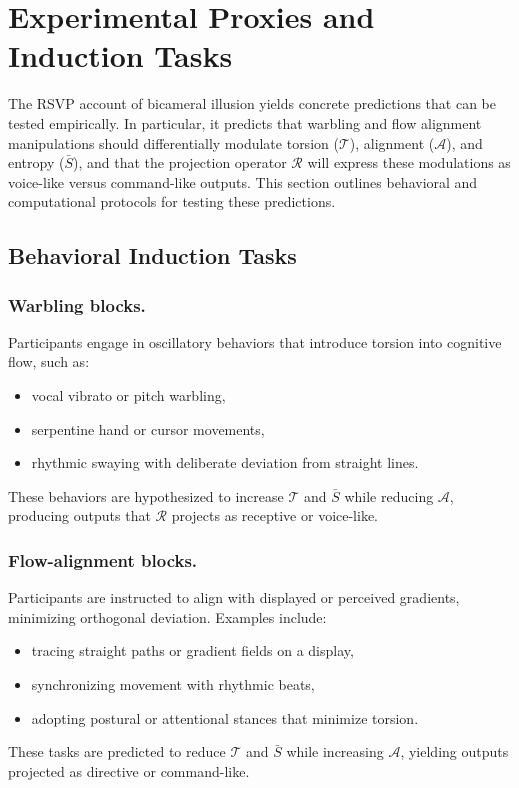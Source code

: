 \documentclass[a4paper,11pt]{article}
\begin{document}
\section{Experimental Proxies and Induction Tasks}
\label{sec:experimental}

The RSVP account of bicameral illusion yields concrete predictions that can be
tested empirically. In particular, it predicts that warbling and
flow alignment manipulations should differentially modulate torsion
($\mathcal{T}$), alignment ($\mathcal{A}$), and entropy ($\bar{S}$), and that
the projection operator $\mathcal{R}$ will express these modulations as
voice-like versus command-like outputs. This section outlines behavioral and
computational protocols for testing these predictions.

\subsection{Behavioral Induction Tasks}

\subsubsection{Warbling blocks.}
Participants engage in oscillatory behaviors that introduce torsion into
cognitive flow, such as:
\begin{itemize}
    \item vocal vibrato or pitch warbling,
    \item serpentine hand or cursor movements,
    \item rhythmic swaying with deliberate deviation from straight lines.
\end{itemize}
These behaviors are hypothesized to increase $\mathcal{T}$ and $\bar{S}$ while
reducing $\mathcal{A}$, producing outputs that $\mathcal{R}$ projects as
receptive or voice-like.

\subsubsection{Flow-alignment blocks.}
Participants are instructed to align with displayed or perceived gradients,
minimizing orthogonal deviation. Examples include:
\begin{itemize}
    \item tracing straight paths or gradient fields on a display,
    \item synchronizing movement with rhythmic beats,
    \item adopting postural or attentional stances that minimize torsion.
\end{itemize}
These tasks are predicted to reduce $\mathcal{T}$ and $\bar{S}$ while
increasing $\mathcal{A}$, yielding outputs projected as directive or
command-like.
\end{document}
